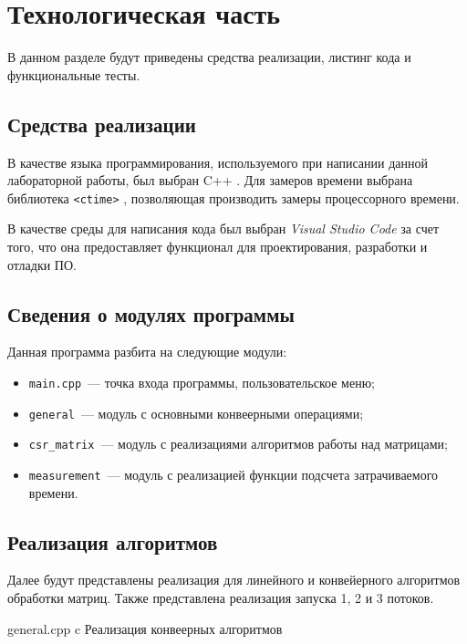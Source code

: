 \chapter{Технологическая часть}
В данном разделе будут приведены средства реализации, листинг кода и функциональные тесты.

\section{Средства реализации}

В качестве языка программирования, используемого при написании данной лабораторной работы, был выбран C++ \cite{cpp-lang}. Для замеров времени выбрана библиотека \texttt{<ctime>} \cite{ctime}, позволяющая производить замеры процессорного времени.

В качестве среды для написания кода был выбран \textit{Visual Studio Code} за счет того, что она предоставляет функционал для проектирования, разработки и отладки ПО.

\section{Сведения о модулях программы}

Данная программа разбита на следующие модули:

\begin{itemize}
    \item \texttt{main.cpp}~--- точка входа программы, пользовательское меню;
    \item \texttt{general}~--- модуль с основными конвеерными операциями;
    \item \texttt{csr\_matrix}~--- модуль с реализациями алгоритмов работы над матрицами;
    \item \texttt{measurement}~--- модуль с реализацией функции подсчета затрачиваемого времени.
\end{itemize}



\clearpage

\section{Реализация алгоритмов}

Далее будут представлены реализация для линейного и конвейерного алгоритмов обработки матриц. Также представлена реализация запуска 1, 2 и 3 потоков.


    {general.cpp}
    {c}
    {Реализация конвеерных алгоритмов}
	

